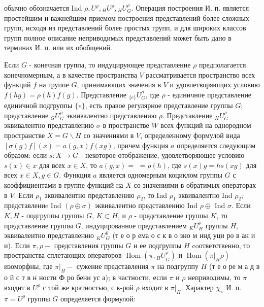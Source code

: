 \documentclass[10pt]{article}
\begin{document}
обычно обозначается Ind $\rho, U^{\rho},{ }_{H} U^{\rho},{ }_{H} U_{G}^{\rho}$. Операция построения И. п. является простейшим и важнейшим приемом построения представлений более сложных групп, исходя из представлений более простых групп, и для широких классов групп полное описание неприводимых представлений может быть дано в терминах И. п. или их обобщений.



Если $G$ - конечная группа, то индуцирующее представление $\rho$ предполагается конечномерным, а в качестве пространства $V$ рассматривается пространство всех функций $f$ на группе $G$, принимающих значения в $V$ и удовлетворяющих условию $f(h g)=\rho(h) f(g)$. Представление ${ }_{\{e\}} U_{G}^{\rho}$, где $\rho$ - единичное представление единичной подгруппы $\{e\}$, есть правое регулярное представление группы $G$; представление ${ }_{G} U_{G}^{\rho}$ эквивалентно представлению $\rho$. Представление ${ }_{H} U_{G}^{\rho}$ эквивалентно представлению $\sigma$ в пространстве $W$ всех функций на однородном пространстве $X=G \backslash H$ со значениями в $V$, определенному формулой вида $[\sigma(g) f](x)=a(g, x) f(x g)$, причем функция $a$ определяется следующим образом: если $s: X \rightarrow G$ - некоторое отображение, удовлетворяющее условию $s(x) \in x$ для всех $x \in X$, то $a(g, x)=$ $=\rho(h)$, где $s(x) g=h s(x g)$ для всех $x \in X, g \in G$. Функция $a$ является одномерным коциклом группы $G$ с коэффициентами в группе функций на $X$ со значениями в обратимых операторах в $V$. Если $\rho_{1}$ эквивалентно представлению $\rho_{2}$, то Ind $\rho_{1}$ эквивалентно Ind $\rho_{2}$; представлениe Ind $(\rho \oplus \sigma)$ эквивалентно представлению Ind $\rho \oplus$ Ind $\sigma$. Если $K, H$ - подгруппы группы $G$, $K \subset H$, и $\rho$ - представление группы $K$, то представление группы $G$, индуцированное представлением ${ }_{K} U_{H}^{\rho}$ группы $H$, эквивалентно представлению ${ }_{K} U_{G}^{0}$ (т е о р ема о с к в о зно м инд уци ро в ан и и). Если $\pi, \rho-$ представления группы $G$ и ее подгруппы $H$ coответственно, то пространства сплетающих операторов $\operatorname{Hom}\left(\pi,{ }_{H} U_{\dot{G}}^{\rho}\right)$ и $\operatorname{Hom}\left(\left.\pi\right|_{H} \rho\right)$ изоморфны, где $\left.\pi\right|_{H}-$ сужение представления $\pi$ на подгруппу $H$ (т е о ре м а д в о й с т в н ности Ф ро бени ус а); в частности, если $\pi$ и $\rho$ неприводимы, то $\pi$ входит в $U^{\rho}$ с той же кратностью, с к-рой $\rho$ входит в $\left.\pi\right|_{H}$. Характер $\chi_{\pi}$ И. п. $\pi=U^{\rho}$ группы $G$ определяется формулой:
\end{document}
